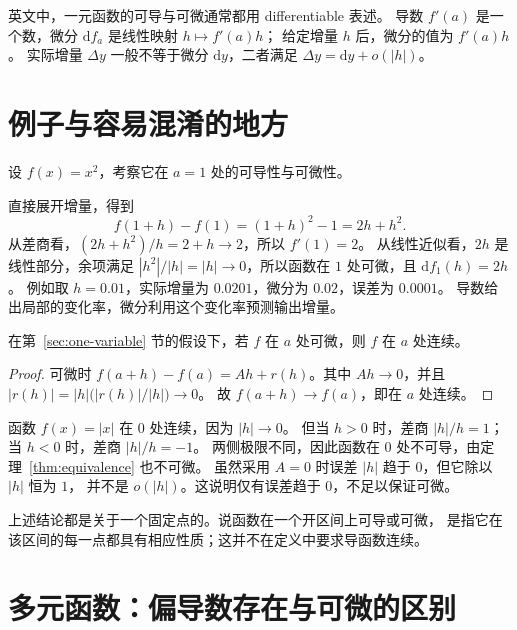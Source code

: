 \documentclass[UTF8,12pt,a4paper,fontset=fandol]{ctexart}
\begin{document}
\begin{remark}[术语与记号]
英文中，一元函数的可导与可微通常都用 differentiable 表述。
导数 $f'(a)$ 是一个数，微分 $\mathrm df_a$ 是线性映射 $h\mapsto f'(a)h$；
给定增量 $h$ 后，微分的值为 $f'(a)h$。
实际增量 $\Delta y$ 一般不等于微分 $\mathrm dy$，二者满足
$\Delta y=\mathrm dy+o(|h|)$。
\end{remark}

\section{例子与容易混淆的地方}
\label{sec:examples}

\begin{example}[同一变化的两种观察方式]
设 $f(x)=x^2$，考察它在 $a=1$ 处的可导性与可微性。
\end{example}
\begin{solve}
直接展开增量，得到
\[
  f(1+h)-f(1)=(1+h)^2-1=2h+h^2.
\]
从差商看，$(2h+h^2)/h=2+h\to2$，所以 $f'(1)=2$。
从线性近似看，$2h$ 是线性部分，余项满足
$|h^2|/|h|=|h|\to0$，所以函数在 $1$ 处可微，且 $\mathrm df_1(h)=2h$。
例如取 $h=0.01$，实际增量为 $0.0201$，微分为 $0.02$，误差为 $0.0001$。
导数给出局部的变化率，微分利用这个变化率预测输出增量。
\end{solve}

\begin{proposition}[可微蕴含连续]
\label{prop:continuity}
在第~\ref{sec:one-variable} 节的假设下，若 $f$ 在 $a$ 处可微，则 $f$ 在 $a$ 处连续。
\end{proposition}
\begin{proof}
可微时 $f(a+h)-f(a)=Ah+r(h)$。其中 $Ah\to0$，并且
$|r(h)|=|h|\bigl(|r(h)|/|h|\bigr)\to0$。
故 $f(a+h)\to f(a)$，即在 $a$ 处连续。
\end{proof}

\begin{example}[连续不保证可导或可微]
函数 $f(x)=|x|$ 在 $0$ 处连续，因为 $|h|\to0$。
但当 $h>0$ 时，差商 $|h|/h=1$；当 $h<0$ 时，差商 $|h|/h=-1$。
两侧极限不同，因此函数在 $0$ 处不可导，由定理~\ref{thm:equivalence} 也不可微。
虽然采用 $A=0$ 时误差 $|h|$ 趋于 $0$，但它除以 $|h|$ 恒为 $1$，
并不是 $o(|h|)$。这说明仅有误差趋于 $0$，不足以保证可微。
\end{example}

上述结论都是关于一个固定点的。说函数在一个开区间上可导或可微，
是指它在该区间的每一点都具有相应性质；这并不在定义中要求导函数连续。

\section{多元函数：偏导数存在与可微的区别}
\label{sec:several-variables}
\end{document}
